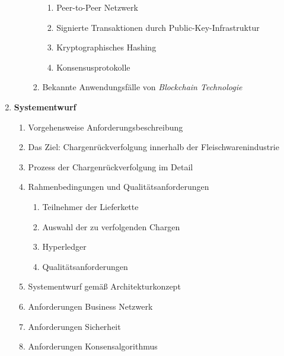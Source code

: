 \begin{small}
\begin{enumerate}
\begin{enumerate}[label*=\arabic*.]
\begin{enumerate}[label*=\arabic*.]
        \begin{enumerate}[label*=\arabic*.]
          \item Peer-to-Peer Netzwerk
          \item Signierte Transaktionen durch Public-Key-Infrastruktur
          \item Kryptographisches Hashing
          \item Konsensusprotokolle
        \end{enumerate}
        \item Bekannte Anwendungsfälle von \textit{Blockchain Technologie}
      \end{enumerate}
    \end{enumerate}
    \item \textbf{Systementwurf}
    \begin{enumerate}[label*=\arabic*.]
      \item Vorgehensweise Anforderungsbeschreibung
      \item Das Ziel: Chargenrückverfolgung innerhalb der Fleischwarenindustrie
      \item Prozess der Chargenrückverfolgung im Detail
      \item Rahmenbedingungen und Qualitätsanforderungen
      \begin{enumerate}[label*=\arabic*.]
        \item Teilnehmer der Lieferkette
        \item Auswahl der zu verfolgenden Chargen
        \item Hyperledger
        \item Qualitätsanforderungen
      \end{enumerate}
      \item Systementwurf gemäß Architekturkonzept
      \item Anforderungen Business Netzwerk
      \item Anforderungen Sicherheit
      \item Anforderungen Konsensalgorithmus

\end{enumerate}
\end{enumerate}
\end{small}
